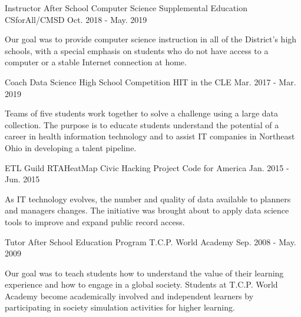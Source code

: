 


\begin{cventries}
  \cventry
    {Instructor} %
    {After School Computer Science Supplemental Education} %
    {CSforAll/CMSD} %
    {Oct. 2018 - May. 2019} %
    {
      \begin{cvcompactparagraph}
        Our goal was to provide computer science instruction in all of the District's high schools, with a special emphasis on students who do not have access to a computer or a stable Internet connection at home.
      \end{cvcompactparagraph}
    }
  \cventry
    {Coach} %
    {Data Science High School Competition} %
    {HIT in the CLE} %
    {Mar. 2017 - Mar. 2019} %
    {
      \begin{cvcompactparagraph}
        Teams of five students work together to solve a challenge using a large data collection. The purpose is to educate students understand the potential of a career in health information technology and to assist IT companies in Northeast Ohio in developing a talent pipeline.
      \end{cvcompactparagraph}
    }
  \cventry
    {ETL Guild} %
    {RTAHeatMap Civic Hacking Project} %
    {Code for America} %
    {Jan. 2015 - Jun. 2015} %
    {
      \begin{cvcompactparagraph}
        As IT technology evolves, the number and quality of data available to planners and managers changes. The initiative was brought about to apply data science tools to improve and expand public record access.
      \end{cvcompactparagraph}
    }
  \cventry
    {Tutor} %
    {After School Education Program} %
    {T.C.P. World Academy} %
    {Sep. 2008 - May. 2009} %
    {
      \begin{cvcompactparagraph}
        Our goal was to teach students how to understand the value of their learning experience and how to engage in a global society.  Students at T.C.P. World Academy become academically involved and independent learners by participating in society simulation activities for higher learning.
      \end{cvcompactparagraph}
    }
\end{cventries}
